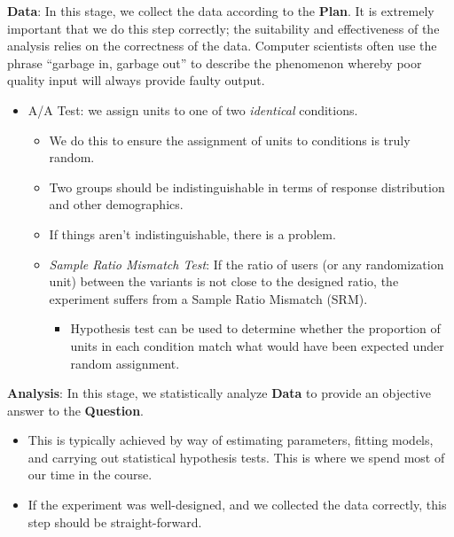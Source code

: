 \begin{framed}
    \textbf{Data}: In this stage, we collect the data according to the \textbf{Plan}.
    It is extremely important that we do this step correctly; the suitability and effectiveness
    of the analysis relies on the correctness of the data. Computer scientists often
    use the phrase
    ``garbage in, garbage out'' to describe the phenomenon whereby poor
    quality input will always provide faulty output.
    \begin{itemize}
        \item A/A Test: we assign units to one of two \emph{identical} conditions.
              \begin{itemize}
                  \item We do this to ensure the assignment of units to conditions is truly random.
                  \item Two groups should be indistinguishable in terms of response distribution
                        and other demographics.
                  \item If things aren't indistinguishable, there is a problem.
                  \item \emph{Sample Ratio Mismatch Test}: If the ratio of users
                        (or any randomization unit) between the variants is not close
                        to the designed ratio, the experiment suffers from a Sample Ratio Mismatch
                        (SRM).
                        \begin{itemize}
                            \item Hypothesis test can be used to determine whether the proportion
                                  of units in each condition match what would have been expected under
                                  random assignment.
                        \end{itemize}
              \end{itemize}
    \end{itemize}
\end{framed}
\begin{framed}
    \textbf{Analysis}: In this stage, we statistically analyze \textbf{Data}
    to provide an objective answer to the \textbf{Question}.
    \begin{itemize}
        \item This is typically achieved by way of estimating parameters, fitting models,
              and carrying out statistical hypothesis tests. This is where we spend most of
              our time in the course.
        \item If the experiment was well-designed, and we collected the data correctly, this
              step should be straight-forward.
    \end{itemize}
\end{framed}
